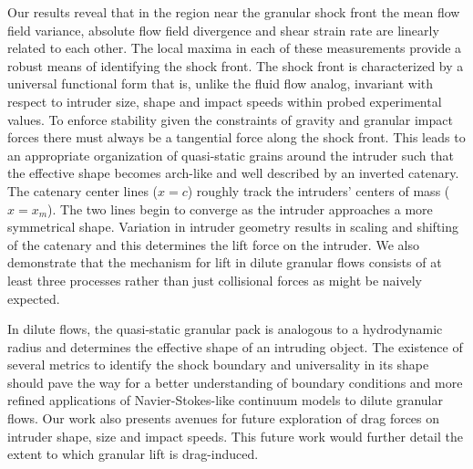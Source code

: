 Our results reveal that in the region near the granular shock front the mean flow field variance, absolute flow field divergence and shear strain rate are linearly related to each other. The local maxima in each of these measurements provide a robust means of identifying the shock front. The shock front is characterized by a universal functional form that is, unlike the fluid flow analog, invariant with respect to intruder size, shape and impact speeds within probed experimental values. To enforce stability given the constraints of gravity and granular impact forces there must always be a tangential force along the shock front. This leads to an appropriate organization of quasi-static grains around the intruder such that the effective shape becomes arch-like and well described by an inverted catenary. The catenary center lines ($x=c$) roughly track the intruders' centers of mass ($x=x_{m}$). The two lines begin to converge as the intruder approaches a more symmetrical shape. Variation in intruder geometry results in scaling and shifting of the catenary and this determines the lift force on the intruder. We also demonstrate that the mechanism for lift in dilute granular flows consists of at least three processes rather than just collisional forces as might be naively expected. 

In dilute flows, the quasi-static granular pack is analogous to a hydrodynamic radius and determines the effective shape of an intruding object. The existence of several metrics to identify the shock boundary and universality in its shape should pave the way for a better understanding of boundary conditions and more refined applications of Navier-Stokes-like continuum models to dilute granular flows. Our work also presents avenues for future exploration of drag forces on intruder shape, size and impact speeds. This future work would further detail the extent to which granular lift is drag-induced. 
